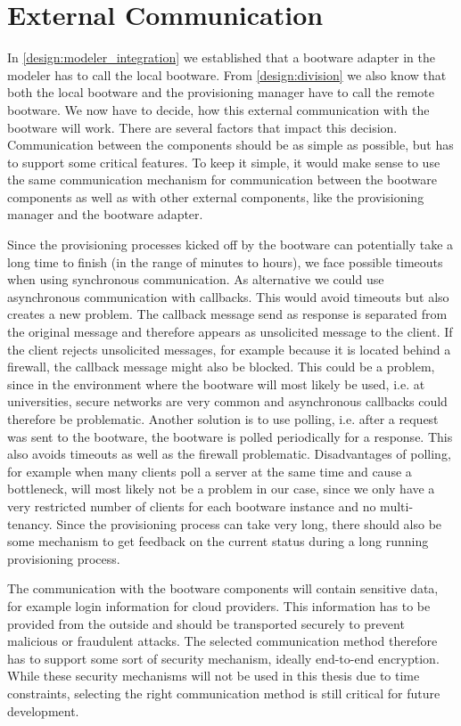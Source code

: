 \section{External Communication}
\label{design:communication}

In \autoref{design:modeler_integration} we established that a bootware adapter in the modeler has to call the local bootware.
From \autoref{design:division} we also know that both the local bootware and the provisioning manager have to call the remote bootware.
We now have to decide, how this external communication with the bootware will work.
There are several factors that impact this decision.
Communication between the components should be as simple as possible, but has to support some critical features.
To keep it simple, it would make sense to use the same communication mechanism for communication between the bootware components as well as with other external components, like the provisioning manager and the bootware adapter.

Since the provisioning processes kicked off by the bootware can potentially take a long time to finish (in the range of minutes to hours), we face possible timeouts when using synchronous communication.
As alternative we could use asynchronous communication with callbacks.
This would avoid timeouts but also creates a new problem.
The callback message send as response is separated from the original message and therefore appears as unsolicited message to the client.
If the client rejects unsolicited messages, for example because it is located behind a firewall, the callback message might also be blocked.
This could be a problem, since in the environment where the bootware will most likely be used, i.e. at universities, secure networks are very common and asynchronous callbacks could therefore be problematic.
Another solution is to use polling, i.e. after a request was sent to the bootware, the bootware is polled periodically for a response.
This also avoids timeouts as well as the firewall problematic.
Disadvantages of polling, for example when many clients poll a server at the same time and cause a bottleneck, will most likely not be a problem in our case, since we only have a very restricted number of clients for each bootware instance and no multi-tenancy.
Since the provisioning process can take very long, there should also be some mechanism to get feedback on the current status during a long running provisioning process.

The communication with the bootware components will contain sensitive data, for example login information for cloud providers.
This information has to be provided from the outside and should be transported securely to prevent malicious or fraudulent attacks.
The selected communication method therefore has to support some sort of security mechanism, ideally end-to-end encryption.
While these security mechanisms will not be used in this thesis due to time constraints, selecting the right communication method is still critical for future development.

